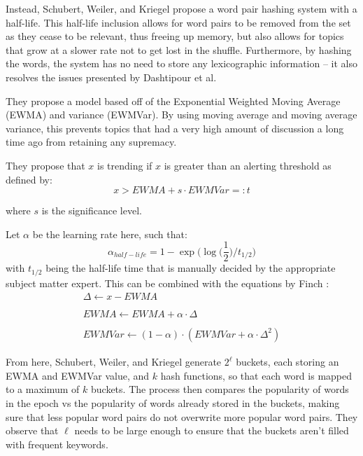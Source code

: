 \documentclass[preprint,review,12pt]{elsarticle}
\begin{document}
Instead, Schubert, Weiler, and Kriegel propose a word pair hashing system with a half-life. This half-life inclusion allows for word pairs to be removed from the set as they cease to be relevant, thus freeing up memory, but also allows for topics that grow at a slower rate not to get lost in the shuffle. Furthermore, by hashing the words, the system has no need to store any lexicographic information -- it also resolves the issues presented by Dashtipour et al.

They propose a model based off of the Exponential Weighted Moving Average (EWMA) and variance (EWMVar). By using moving average and moving average variance, this prevents topics that had a very high amount of discussion a long time ago from retaining any supremacy. 

They propose that $x$ is trending if $x$ is greater than an alerting threshold as defined by:
\begin{equation}
    \label{trending}
    x >EWMA + s \cdot EWMVar =: t
\end{equation}
 
where $s$ is the significance level. 

Let $\alpha$ be the learning rate here, such that:
\[
\alpha_{half-life} = 1 - \exp\big(\log \big(\frac{1}{2}\big)/t_{1/2}\big)
\]
with $t_{1/2}$ being the half-life time that is manually decided by the appropriate subject matter expert.
This can be combined with the equations by Finch \cite{finch2009incremental}:
\begin{equation}
    \label{Finch Equations}
    \begin{split}
        \Delta  \xleftarrow[]{}  x - EWMA \\
        EWMA  \xleftarrow[]{}   EWMA + \alpha \cdot \Delta \\
        EWMVar  \xleftarrow[]{} (1-\alpha) \cdot (EWMVar + \alpha \cdot \Delta^2)
    \end{split}
\end{equation}

From here, Schubert, Weiler, and Kriegel generate $2^\ell$ buckets, each storing an EWMA and EWMVar value, and $k$ hash functions, so that each word is mapped to a maximum of $k$ buckets. The process then compares the popularity of words in the epoch vs the popularity of words already stored in the buckets, making sure that less popular word pairs do not overwrite more popular word pairs. They observe that $\ell$ needs to be large enough to ensure that the buckets aren't filled with frequent keywords. 
\end{document}
